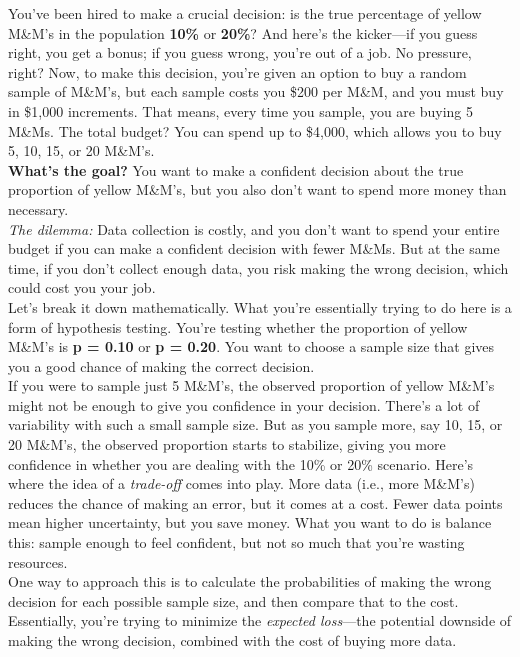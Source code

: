 You’ve been hired to make a crucial decision: is the true percentage of yellow M\&M’s in the population \textbf{10\%} or \textbf{20\%}? And here’s the kicker—if you guess right, you get a bonus; if you guess wrong, you're out of a job. No pressure, right? Now, to make this decision, you’re given an option to buy a random sample of M\&M’s, but each sample costs you \$200 per M\&M, and you must buy in \$1,000 increments. That means, every time you sample, you are buying 5 M\&Ms. The total budget? You can spend up to \$4,000, which allows you to buy 5, 10, 15, or 20 M\&M’s.\\

\textbf{What’s the goal?} You want to make a confident decision about the true proportion of yellow M\&M’s, but you also don’t want to spend more money than necessary.\\

\textit{The dilemma:} Data collection is costly, and you don’t want to spend your entire budget if you can make a confident decision with fewer M\&Ms. But at the same time, if you don’t collect enough data, you risk making the wrong decision, which could cost you your job.\\

Let’s break it down mathematically. What you’re essentially trying to do here is a form of hypothesis testing. You’re testing whether the proportion of yellow M\&M’s is \textbf{p = 0.10} or \textbf{p = 0.20}. You want to choose a sample size that gives you a good chance of making the correct decision.\\

If you were to sample just 5 M\&M’s, the observed proportion of yellow M\&M’s might not be enough to give you confidence in your decision. There’s a lot of variability with such a small sample size. But as you sample more, say 10, 15, or 20 M\&M’s, the observed proportion starts to stabilize, giving you more confidence in whether you are dealing with the 10\% or 20\% scenario. Here’s where the idea of a \textit{trade-off} comes into play. More data (i.e., more M\&M’s) reduces the chance of making an error, but it comes at a cost. Fewer data points mean higher uncertainty, but you save money. What you want to do is balance this: sample enough to feel confident, but not so much that you’re wasting resources.\\

One way to approach this is to calculate the probabilities of making the wrong decision for each possible sample size, and then compare that to the cost. Essentially, you’re trying to minimize the \textit{expected loss}—the potential downside of making the wrong decision, combined with the cost of buying more data. \\


